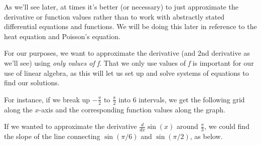 \documentclass{ximera}
\begin{document}
As we'll see later, at times it's better (or necessary) to just approximate the derivative or function values rather than to work with abstractly stated differential equations and functions. We will be doing this later in reference to the heat equation and Poisson's equation. 

For our purposes, we want to approximate the derivative (and 2nd derivative as we'll see) using \emph{only values of f}. That we only use values of \emph{f} is important for our use of linear algebra, as this will let us set up and solve systems of equations to find our solutions.

For instance, if we break up $-\frac{\pi}{2}$ to $\frac{\pi}{2}$ into 6 intervals, we get the following grid along the $x$-axis and the corresponding function values along the graph.


If we wanted to approximate the derivative $\frac{d}{dx}\sin(x)$ around $\frac{\pi}{3}$, we could find the slope of the line connecting $\sin(\pi/6)$ and $\sin(\pi/2)$, as below.
\end{document}
